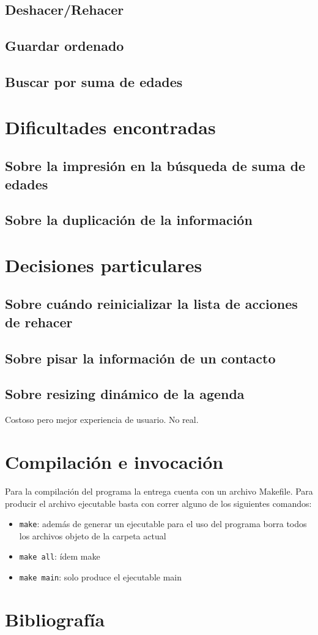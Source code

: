 \documentclass[11pt]{article}
\begin{document}
    \subsection{Deshacer/Rehacer}

    \subsection{Guardar ordenado}

    \subsection{Buscar por suma de edades}

\section{Dificultades encontradas}

    \subsection{Sobre la impresi\'on en la b\'usqueda de suma de edades}

    \subsection{Sobre la duplicaci\'on de la informaci\'on}

\section{Decisiones particulares}

    \subsection{Sobre cu\'ando reinicializar la lista de acciones de rehacer}

    \subsection{Sobre pisar la informaci\'on de un contacto}

    \subsection{Sobre resizing din\'amico de la agenda}
    Costoso pero mejor experiencia de usuario. No real. 

\section{Compilaci\'on e invocaci\'on}
Para la compilaci\'on del programa la entrega cuenta con un archivo Makefile. Para producir el archivo ejecutable basta 
con correr alguno de los siguientes comandos: 

\begin{itemize}
    \item \verb|make|: adem\'as de generar un ejecutable para el uso del programa borra todos los archivos objeto de la carpeta actual
    \item \verb|make all|: \'idem make
    \item \verb|make main|: solo produce el ejecutable main
\end{itemize}

\section{Bibliograf\'ia}
\end{document}

